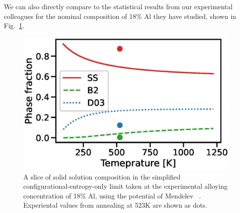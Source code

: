 %
We can also directly compare to the statistical results from our experimental colleagues for the nominal composition of 18\% Al they have studied, shown in Fig.~\ref{fig:conf_1d_phase_fractions}.
%
\begin{figure}[h]
    \label{fig:conf_1d_phase_fractions}
    \centering
    \includegraphics[width=\textwidth]{figures/conf_1d_phase_fractions}
    \caption{A slice of solid solution composition in the simplified configurational-entropy-only limit taken at the experimental alloying concentration of 18\% Al, using the potential of Mendelev \etal~\cite{mendelev2005effect}. Experiental values from annealing at 523K are shown as dots. }
\end{figure}


